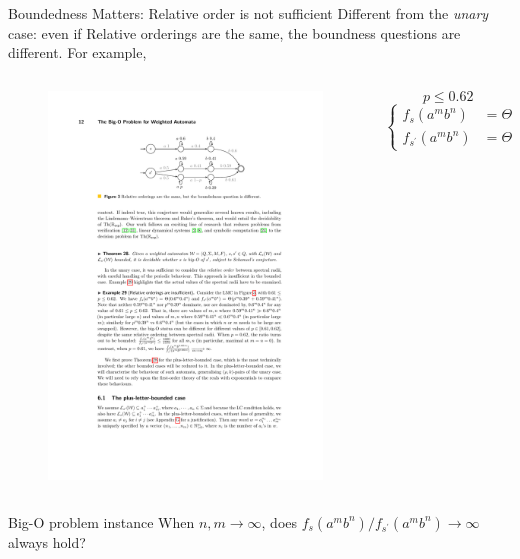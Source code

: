 \documentclass[aspectratio=169]{beamer}
\begin{document}
\begin{frame}{Boundedness Matters: Relative order is not sufficient}
    Different from the \textit{unary} case: even if Relative orderings are the same, the boundness questions are different. For example,
    \begin{columns}
        \begin{column}{.5\textwidth}
            \begin{figure}
                \includegraphics[width=\textwidth]{example}
            \end{figure}

        \end{column}

        \begin{column}{.42\textwidth}
            $$p \le 0.62$$
            $$\begin{cases}
                f_s(a^mb^n) & = \Theta(0.6^m0.4^n) \\
                f_{s^\prime}(a^mb^n) & = \Theta(p^m0.39^n+0.59^m0.41^n) 
            \end{cases}$$
        \end{column}
    \end{columns}
    \begin{block}{Big-O problem instance}
    When $n,m \to \infty$, does $f_s(a^mb^n) / f_{s^\prime}(a^mb^n) \to \infty$ always hold? 
    \end{block}
\end{frame}
\end{document}
